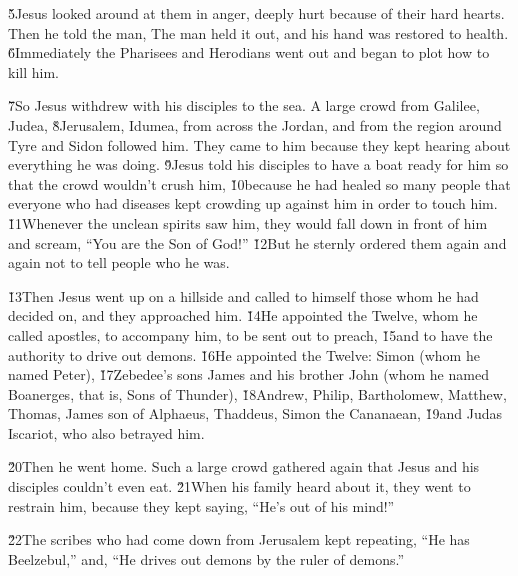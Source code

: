 \v{5}Jesus looked around at them in anger, deeply hurt because of their hard hearts. Then he told the man,  The man held it out, and his hand was restored to health. \v{6}Immediately the Pharisees and Herodians went out and began to plot how to kill him.

\v{7}So Jesus withdrew with his disciples to the sea. A large crowd from Galilee, Judea, \v{8}Jerusalem, Idumea, from across the Jordan, and from the region around Tyre and Sidon followed him. They came to him because they kept hearing about everything he was doing. \v{9}Jesus told his disciples to have a boat ready for him so that the crowd wouldn't crush him, \v{10}because he had healed so many people that everyone who had diseases kept crowding up against him in order to touch him. \v{11}Whenever the unclean spirits saw him, they would fall down in front of him and scream, ``You are the Son of God!'' \v{12}But he sternly ordered them again and again not to tell people who he was.

\v{13}Then Jesus went up on a hillside and called to himself those whom he had decided on, and they approached him. \v{14}He appointed the Twelve, whom he called apostles, to accompany him, to be sent out to preach, \v{15}and to have the authority to drive out demons. \v{16}He appointed the Twelve: Simon (whom he named Peter), \v{17}Zebedee's sons James and his brother John (whom he named Boanerges, that is, Sons of Thunder), \v{18}Andrew, Philip, Bartholomew, Matthew, Thomas, James son of Alphaeus, Thaddeus, Simon the Cananaean, \v{19}and Judas Iscariot, who also betrayed him.

\v{20}Then he went home. Such a large crowd gathered again that Jesus and his disciples couldn't even eat. \v{21}When his family heard about it, they went to restrain him, because they kept saying, ``He's out of his mind!''

\v{22}The scribes who had come down from Jerusalem kept repeating, ``He has Beelzebul,'' and, ``He drives out demons by the ruler of demons.''

